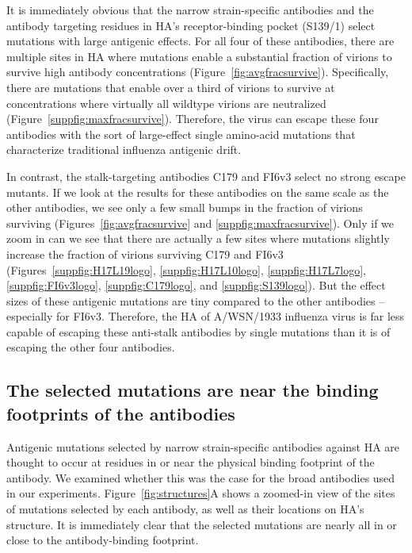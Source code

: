 \documentclass[11pt]{article}
\begin{document}
It is immediately obvious that the narrow strain-specific antibodies and the antibody targeting residues in HA's receptor-binding pocket (S139/1) select mutations with large antigenic effects.
For all four of these antibodies, there are multiple sites in HA where mutations enable a substantial fraction of virions to survive high antibody concentrations (Figure~\ref{fig:avgfracsurvive}).
Specifically, there are mutations that enable over a third of virions to survive at concentrations where virtually all wildtype virions are neutralized (Figure~\ref{suppfig:maxfracsurvive}).
Therefore, the virus can escape these four antibodies with the sort of large-effect single amino-acid mutations that characterize traditional influenza antigenic drift\cite{yewdell1979antigenic,webster1980determination,koel2013substitutions,chambers2015identification,petrie2016antibodies,neher2016prediction}.  

In contrast, the stalk-targeting antibodies C179 and FI6v3 select no strong escape mutants. 
If we look at the results for these antibodies on the same scale as the other antibodies, we see only a few small bumps in the fraction of virions surviving (Figures~\ref{fig:avgfracsurvive} and \ref{suppfig:maxfracsurvive}).
Only if we zoom in can we see that there are actually a few sites where mutations slightly increase the fraction of virions surviving C179 and FI6v3 (Figures~\ref{suppfig:H17L19logo}, \ref{suppfig:H17L10logo}, \ref{suppfig:H17L7logo}, \ref{suppfig:FI6v3logo}, \ref{suppfig:C179logo}, and \ref{suppfig:S139logo}).
But the effect sizes of these antigenic mutations are tiny compared to the other antibodies -- especially for FI6v3.
Therefore, the HA of A/WSN/1933 influenza virus is far less capable of escaping these anti-stalk antibodies by single mutations than it is of escaping the other four antibodies. 

\subsection*{The selected mutations are near the binding footprints of the antibodies}
Antigenic mutations selected by narrow strain-specific antibodies against HA are thought to occur at residues in or near the physical binding footprint of the antibody\cite{yewdell1979antigenic,webster1980determination,caton1982antigenic}.
We examined whether this was the case for the broad antibodies used in our experiments.
Figure~\ref{fig:structures}A shows a zoomed-in view of the sites of mutations selected by each antibody, as well as their locations on HA's structure. 
It is immediately clear that the selected mutations are nearly all in or close to the antibody-binding footprint.
\end{document}
